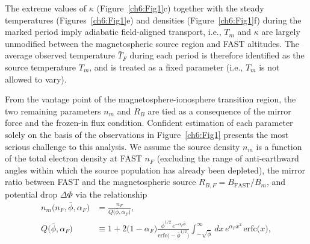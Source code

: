   The extreme values of $\kappa$ (Figure~\ref{ch6:Fig1}c) together with
  the steady temperatures (Figures~\ref{ch6:Fig1}e) and densities
  (Figure~\ref{ch6:Fig1}f) during the marked period imply adiabatic
  field-aligned transport, i.e., $T_m$ and $\kappa$ are largely
  unmodified between the magnetospheric source region and FAST
  altitudes. The average observed temperature $\bar{T}_F$ during each
  period is therefore identified as the source temperature $T_m$, and
  is treated as a fixed parameter (i.e., $T_m$ is not allowed to vary).
  
  From the vantage point of the magnetosphere-ionosphere transition
  region, the two remaining parameters $n_m$ and $R_B$ are tied as a
  consequence of the mirror force and the frozen-in flux
  condition. Confident estimation of each parameter solely on the
  basis of the observations in Figure~\ref{ch6:Fig1} presents the most
  serious challenge to this analysis. We assume the source density
  $n_m$ is a function of the total electron density at FAST $n_F$
  (excluding the range of anti-earthward angles within which the
  source population has already been depleted), the mirror ratio
  between FAST and the magnetospheric source $R_{B,F} =
  B_\textrm{FAST} / B_m$, and potential drop $\Delta \Phi$ via the
  relationship \citep{Ratner1976,Barbosa1977}
  \begin{subequations}
    \begin{align} n_m \big ( n_F, \bar{\phi}, \alpha_F \big ) &= \frac{n_F}{Q \big ( \bar{\phi}, \alpha_F \big ) }, \\
      Q \big ( \bar{\phi}, \alpha_F \big ) &\equiv 1 + 2 \big ( 1 -
      \alpha_F \big ) \frac{ \bar{\phi}^{1/2} \, e^{- \alpha_F
          \bar{\phi}} }{\textrm{erfc} \big ( - \bar{\phi}^{1/2} \big
        )} { \displaystyle \int_{-\sqrt{\bar{\phi}}}^{\infty} } \, dx
      \, e^{\alpha_F x^2} \, \textrm{erfc} \big ( x \big
      ), \label{ch6:eqBarbosa}
    \end{align}
  \end{subequations}
